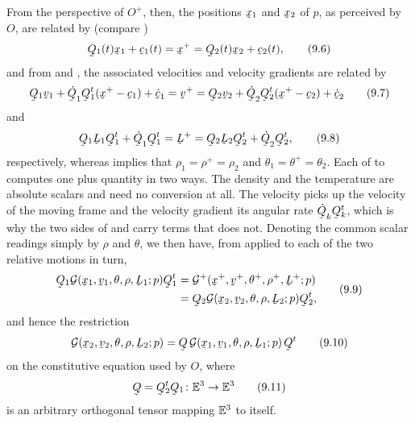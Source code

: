 From the perspective of $O^{+}$, then, the positions $\bx_{1}$ and
$\bx_{2}$ of $p$, as perceived by $O$, are related by (compare
)
\begin{equation}
   \bQ_{1}(t)\bx_{1}+\bc_{1}(t)=\bx^{+}=\bQ_{2}(t)\bx_{2}+\bc_{2}(t),
   \tag{9.6}\label{eq:9.6}
\end{equation}
and from  and , the associated velocities and
velocity gradients are related by
\begin{equation}
   \bQ_{1}\bv_{1}+\dot\bQ_{1}\bQ_{1}^{t}(\bx^{+}-\bc_{1})+\dot\bc_{1}
   =\bv^{+}
   =\bQ_{2}\bv_{2}+\dot\bQ_{2}\bQ_{2}^{t}(\bx^{+}-\bc_{2})+\dot\bc_{2}
   \tag{9.7}\label{eq:9.7}
\end{equation}
and
\begin{equation}
   \bQ_{1}\bL_{1}\bQ_{1}^{t}+\dot\bQ_{1}\bQ_{1}^{t}
   =\bL^{+}
   =\bQ_{2}\bL_{2}\bQ_{2}^{t}+\dot\bQ_{2}\bQ_{2}^{t},
   \tag{9.8}\label{eq:9.8}
\end{equation}
respectively, whereas  implies that $\rho_{1}=\rho^{+}=\rho_{2}$
and $\theta_{1}=\theta^{+}=\theta_{2}$. Each of  to 
computes one plus quantity in two ways. The density and the temperature
are absolute scalars and need no conversion at all. The velocity picks
up the velocity of the moving frame and the velocity gradient its
angular rate $\dot\bQ_{k}\bQ_{k}^{t}$, which is why the two sides of
 and  carry terms that  does not. Denoting
the common scalar readings simply by $\rho$ and $\theta$, we then have,
from  applied to each of the two relative motions in turn,
\begin{equation}
\begin{aligned}
   \bQ_{1}\mathcal{G}(\bx_{1},\bv_{1},\theta,\rho,\bL_{1};p)\bQ_{1}^{t}
   &=\mathcal{G}^{+}(\bx^{+},\bv^{+},\theta^{+},\rho^{+},\bL^{+};p)\\
   &=\bQ_{2}\mathcal{G}(\bx_{2},\bv_{2},\theta,\rho,\bL_{2};p)
     \bQ_{2}^{t},
\end{aligned}
   \tag{9.9}\label{eq:9.9}
\end{equation}
and hence the restriction
\begin{equation}
   \mathcal{G}(\bx_{2},\bv_{2},\theta,\rho,\bL_{2};p)
   =\bQ\,\mathcal{G}(\bx_{1},\bv_{1},\theta,\rho,\bL_{1};p)\,\bQ^{t}
   \tag{9.10}\label{eq:9.10}
\end{equation}
on the constitutive equation used by $O$, where
\begin{equation}
   \bQ=\bQ_{2}^{t}\bQ_{1}\colon\Vt\to\Vt
   \tag{9.11}\label{eq:9.11}
\end{equation}
is an arbitrary orthogonal tensor mapping $\mathbb{E}^{3}$ to itself.

